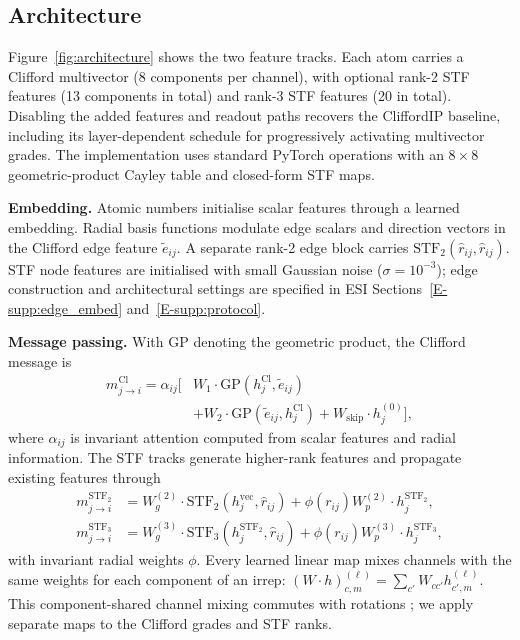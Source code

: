 \subsection{Architecture}\label{sec:architecture}

Figure~\ref{fig:architecture} shows the two feature tracks. Each atom carries a Clifford multivector (8 components per channel), with optional rank-2 STF features (13 components in total) and rank-3 STF features (20 in total). Disabling the added features and readout paths recovers the CliffordIP baseline, including its layer-dependent schedule for progressively activating multivector grades. The implementation uses standard PyTorch operations \cite{paszke2019pytorch} with an $8\times8$ geometric-product Cayley table and closed-form STF maps.

\textbf{Embedding.} Atomic numbers initialise scalar features through a learned embedding. Radial basis functions modulate edge scalars and direction vectors in the Clifford edge feature $\tilde e_{ij}$. A separate rank-2 edge block carries $\mathrm{STF}_2(\hat r_{ij},\hat r_{ij})$. STF node features are initialised with small Gaussian noise ($\sigma=10^{-3}$); edge construction and architectural settings are specified in ESI Sections~\ref{E-supp:edge_embed} and~\ref{E-supp:protocol}.

\textbf{Message passing.} With $\mathrm{GP}$ denoting the geometric product, the Clifford message is
\begin{align*}
m^{\mathrm{Cl}}_{j\to i}=\alpha_{ij}\bigl[&W_1\cdot\mathrm{GP}(h_j^{\mathrm{Cl}},\tilde e_{ij}) \\
&+W_2\cdot\mathrm{GP}(\tilde e_{ij},h_j^{\mathrm{Cl}})+W_{\mathrm{skip}}\cdot h_j^{(0)}\bigr],
\end{align*}
where $\alpha_{ij}$ is invariant attention computed from scalar features and radial information. The STF tracks generate higher-rank features and propagate existing features through
\begin{align*}
m^{\mathrm{STF}_2}_{j\to i}&=W_g^{(2)}\cdot\mathrm{STF}_2(h_j^{\mathrm{vec}},\hat r_{ij})+\phi(r_{ij})W_p^{(2)}\cdot h_j^{\mathrm{STF}_2}, \\
m^{\mathrm{STF}_3}_{j\to i}&=W_g^{(3)}\cdot\mathrm{STF}_3(h_j^{\mathrm{STF}_2},\hat r_{ij})+\phi(r_{ij})W_p^{(3)}\cdot h_j^{\mathrm{STF}_3},
\end{align*}
with invariant radial weights $\phi$. Every learned linear map mixes channels with the same weights for each component of an irrep: $(W\cdot h)^{(\ell)}_{c,m}=\sum_{c'}W_{cc'}h^{(\ell)}_{c',m}$. This component-shared channel mixing commutes with rotations \cite{shao2025orthonormal}; we apply separate maps to the Clifford grades and STF ranks.


